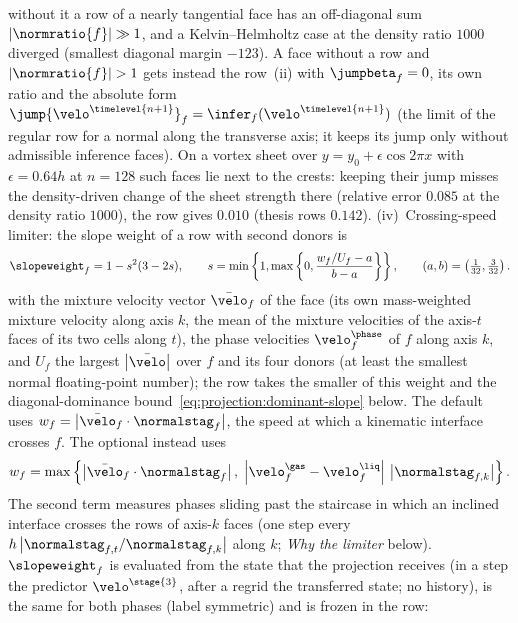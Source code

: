 without it a row of a nearly tangential face has an off-diagonal sum
$\abs{\normratio{f}}\gg1$, and a Kelvin--Helmholtz case at the density ratio
$1000$ diverged (smallest diagonal margin $-123$). A face without a row and
$\abs{\normratio{f}}>1$ gets instead the row~(ii) with $\jumpbeta_f=0$, its
own ratio and the absolute form
$\jump{\velo^{\timelevel{n+1}}}_f=\infer_f(\velo^{\timelevel{n+1}})$ (the
limit of the regular row for a normal along the transverse axis; it keeps
its jump only without admissible inference faces). On a vortex sheet over
$y=y_0+\epsilon\cos2\pi x$ with $\epsilon=0.64h$ at $n=128$ such faces lie
next to the crests: keeping their jump misses the density-driven change of
the sheet strength there (relative error $0.085$ at the density ratio
$1000$), the row gives $0.010$ (thesis rows $0.142$).
(iv)~Crossing-speed limiter: the slope weight of a row with second donors is
\begin{equation}\label{eq:projection:crossing-limiter}
  \begin{gathered}
  \slopeweight_f=1-s^2(3-2s),\qquad
  s=\min\curlypar{1,\max\curlypar{0,\frac{w_f/U_f-a}{b-a}}},\qquad
  (a,b)=\roundpar{\tfrac1{32},\tfrac3{32}}.
  \end{gathered}
\end{equation}
with the mixture velocity vector $\bar{\velo}_f$ of the face (its own
mass-weighted mixture velocity along axis $k$, the mean of the mixture
velocities of the axis-$t$ faces of its two cells along $t$), the phase
velocities $\velo^{\phase}_f$ of $f$ along axis $k$, and $U_f$ the
largest $\abs{\bar{\velo}}$ over $f$ and its four donors (at least the
smallest normal floating-point number); the row takes the smaller of this
weight and the diagonal-dominance bound~\cref{eq:projection:dominant-slope}
below. The default  uses
$w_f=\abs{\bar{\velo}_f\cdot\normalstag_f}$, the speed at which a kinematic
interface crosses $f$. The optional  instead uses
\[
  w_f=\max\curlypar{\abs{\bar{\velo}_f\cdot\normalstag_f},\;
    \abs{\velo^{\gas}_f-\velo^{\liq}_f}\,\abs{\normalstag_{f,k}}}.
\]
The second term measures phases sliding past the staircase in which an
inclined interface crosses the rows of axis-$k$ faces (one step every
$h\abs{\normalstag_{f,t}/\normalstag_{f,k}}$ along $k$; \emph{Why the limiter}
below). $\slopeweight_f$ is evaluated from the
state that the projection receives (in a step the predictor
$\velo^{\stage{3}}$, after a regrid the transferred state; no history), is
the same for both phases (label symmetric) and is frozen in the row:
